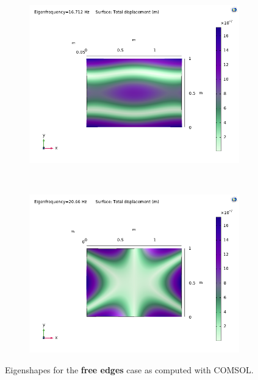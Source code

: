 \documentclass[a4paper]{article}
\begin{document}
\begin{figure}[h]
	\begin{subfigure}[b]{0.31\linewidth}
		\includegraphics[width=0.9\linewidth]{comsol/4f.png}
	\end{subfigure}
	~
	\begin{subfigure}[b]{0.31\linewidth}
		\includegraphics[width=0.9\linewidth]{comsol/5f.png}
	\end{subfigure}
	\caption{Eigenshapes for the \textbf{free edges} case as computed with COMSOL.}
	\label{fig:f_com}
\end{figure}
\end{document}
